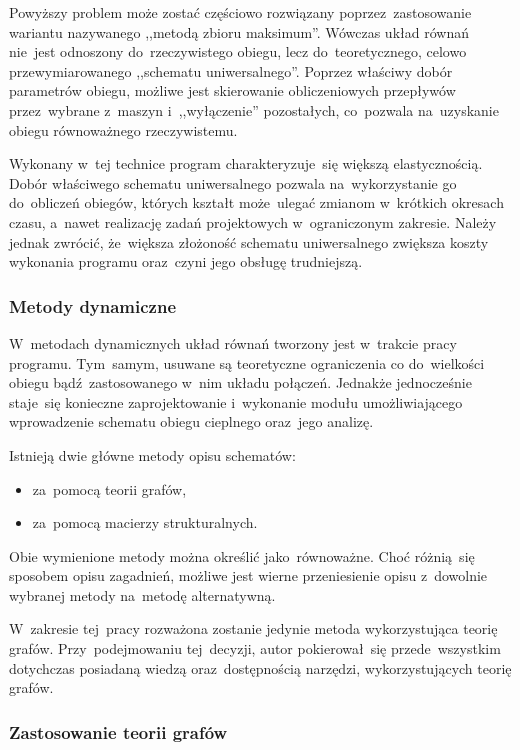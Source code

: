 Powyższy problem może zostać częściowo rozwiązany poprzez~zastosowanie
wariantu nazywanego ,,metodą zbioru maksimum''. Wówczas układ równań
nie~jest odnoszony do~rzeczywistego obiegu, lecz do~teoretycznego,
celowo przewymiarowanego ,,schematu uniwersalnego''. Poprzez właściwy
dobór parametrów obiegu, możliwe jest skierowanie obliczeniowych
przepływów przez~wybrane z~maszyn i~,,wyłączenie'' pozostałych,
co~pozwala na~uzyskanie obiegu równoważnego rzeczywistemu.

Wykonany w~tej technice program charakteryzuje~się większą
elastycznością. Dobór właściwego schematu uniwersalnego pozwala
na~wykorzystanie go do~obliczeń obiegów, których kształt może~ulegać
zmianom w~krótkich okresach czasu, a~nawet realizację zadań projektowych
w~ograniczonym zakresie. Należy jednak zwrócić, że~większa złożoność
schematu uniwersalnego zwiększa koszty wykonania programu oraz~czyni
jego obsługę trudniejszą.


\subsubsection{Metody dynamiczne}

W~metodach dynamicznych układ równań tworzony jest w~trakcie pracy
programu. Tym~samym, usuwane są teoretyczne ograniczenia co do~wielkości
obiegu bądź~zastosowanego w~nim układu połączeń. Jednakże jednocześnie
staje~się konieczne zaprojektowanie i~wykonanie modułu umożliwiającego
wprowadzenie schematu obiegu cieplnego oraz~jego analizę.

Istnieją dwie główne metody opisu schematów:

\begin{itemize}
	\item za~pomocą teorii grafów,

	\item za~pomocą macierzy strukturalnych.
\end{itemize}

Obie wymienione metody można określić jako~równoważne. Choć różnią~się
sposobem opisu zagadnień, możliwe jest wierne przeniesienie opisu
z~dowolnie wybranej metody na~metodę alternatywną.

W~zakresie tej~pracy rozważona zostanie jedynie metoda wykorzystująca
teorię grafów. Przy~podejmowaniu tej~decyzji, autor pokierował~się
przede~wszystkim dotychczas posiadaną wiedzą oraz~dostępnością narzędzi,
wykorzystujących teorię grafów.


\subsubsection{Zastosowanie teorii grafów}

